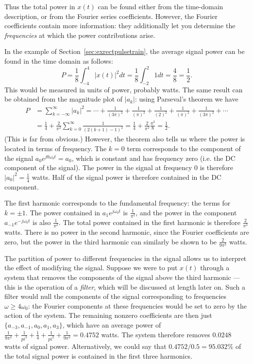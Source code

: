 \documentclass[10pt]{beamer}
\begin{document}
Thus the total power in $x(t)$ can be found either from the time-domain description, or from the Fourier series coefficients.  However, the Fourier coefficients contain more information:  they additionally let you determine the {\em frequencies} at which the power contributions arise.  

In the example of Section~\ref{sec:exrectpulsetrain}, the average signal power can be found in the time domain as follows:
\begin{equation*}
  P = \frac{1}{8} \int_{-4}^4 |x(t)|^2 dt = \frac{1}{8} \int_{-2}^2 1 dt = \frac{4}{8} = \frac{1}{2}.
\end{equation*}
This would be measured in units of power, probably watts.  The same result can be obtained from the magnitude plot of $|a_k|$:  using Parseval's theorem we have
\begin{align*}
  P &= \sum_{k=-\infty}^{\infty} |a_k|^2 
  = \cdots + \frac{1}{(3 \pi)^2} + \frac{1}{(\pi)^2} + \frac{1}{(2)^2} + \frac{1}{(\pi)^2}  + \frac{1}{(3 \pi)^2} + \cdots \\
  &= \frac{1}{4} + \frac{2}{\pi^2} \sum_{k=0}^{\infty} \frac{1}{(2(k+1) - 1)^2} 
  = \frac{1}{4} + \frac{2}{\pi^2} \frac{\pi^2}{8} = \frac{1}{2}.
\end{align*}
(This is far from obvious.)  However, the theorem also tells us where the power is located in terms of frequency.  The  $k=0$ term corresponds to the component of the signal $a_0 e^{j 0 \omega_0 t} = a_0$, which is constant and has frequency zero (i.e. the DC component of the signal).  The power in the signal at frequency $0$ is therefore $|a_0|^2 = \frac{1}{4}$ watts.  Half of the signal power is therefore contained in the DC component.  

The first harmonic corresponds to the fundamental frequency:  the terms for $k=\pm 1$.  The power contained in $a_1 e^{j \omega_0 t}$ is $\frac{1}{\pi^2}$, and the power in the component $a_{-1} e^{-j \omega_0 t}$ is also $\frac{1}{\pi^2}$.  The total power contained in the first harmonic is therefore $\frac{2}{\pi^2}$ watts.  There is no power in the second harmonic, since the Fourier coefficients are zero, but the power in the third harmonic can similarly be shown to be $\frac{2}{9 \pi^2}$ watts.

The partition of power to different frequencies in the signal allows us to interpret the effect of modifying the signal.  Suppose we were to put $x(t)$ through a system that removes the components of the signal above the third harmonic --- this is the operation of a {\em filter}, which will be discussed at length later on.  Such a filter would null the components of the signal corresponding to frequencies $\omega \geq 4 \omega_0$:  the Fourier components at these frequencies would be set to zero by the action of the system.  The remaining nonzero coefficients are then just $\{a_{-3}, a_{-1}, a_0, a_1, a_3\}$, which have an average power of $\frac{1}{9 \pi^2} + \frac{1}{pi^2} + \frac{1}{4} + \frac{1}{pi^2} + \frac{1}{9 \pi^2} = 0.4752$ watts.  The system therefore removes $0.0248$ watts of signal power.  Alternatively, we could say that $0.4752/0.5 = 95.032$\% of the total signal power is contained in the first three harmonics.
\end{document}
